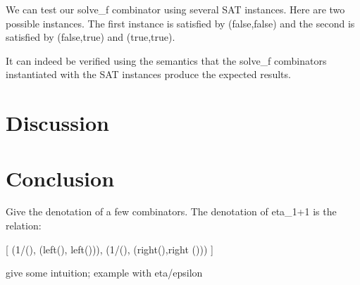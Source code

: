 \documentclass{llncs}
\begin{document}
We can test our {{solve_f}} combinator using several SAT
instances. Here are two possible instances. The first instance is
satisfied by {{(false,false)}} and the
second is satisfied by {{(false,true)}} and {{(true,true)}}.

% 

It can indeed be verified using the semantics that the {{solve_f}}
combinators instantiated with the SAT instances produce the expected
results. 

\section{Discussion}
\label{sec:cat} 

\section{Conclusion}

Give the denotation of a few combinators. The denotation of {{eta_{1+1} }} is
the relation:

{{ {[ (1/(), (left(), left())), (1/(), (right(),right ())) ]} }}

give some intuition; example with eta/epsilon
\end{document}
